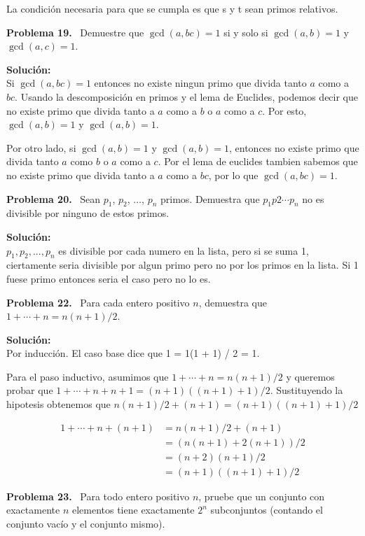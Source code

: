 \documentclass{article}
\newcounter{problem}
\newcounter{solution}
\newcommand\Problem[1]{%
  \stepcounter{problem}%
  \textbf{Problema #1.}~%
  \setcounter{solution}{0}%
}
\newcommand\TheSolution{%
  \textbf{Solución:}\\%
}
\begin{document}
La condición necesaria para que se cumpla es que s y t sean primos relativos.


\Problem{19} Demuestre que $\gcd(a, bc) = 1$ si y solo si $\gcd(a, b) = 1$ y
$\gcd(a, c) = 1$.

\TheSolution{}
Si $\gcd(a, bc) = 1$ entonces no existe ningun primo que divida tanto $a$ como
a $bc$. Usando la descomposición en primos y el lema de Euclides, podemos
decir que no existe primo que divida tanto a $a$ como a $b$ o $a$ como a $c$.
Por esto, $\gcd(a, b) = 1$ y $\gcd(a, b) = 1$.

Por otro lado, si $\gcd(a, b) = 1$ y $\gcd(a, b) = 1$, entonces no existe primo
que divida tanto $a$ como $b$ o $a$ como a $c$. Por el lema de euclides tambien
sabemos que no existe primo que divida tanto a $a$ como a $bc$, por lo que
$\gcd(a, bc) = 1$.

\Problem{20} Sean $p_1$, $p_2$, $\ldots$, $p_n$ primos. Demuestra que $p_1 p{2}
\cdots p_n$ no es divisible por ninguno de estos primos.

\TheSolution{}
$p_{1} , p_{2} , . . . , p_{n}$ es divisible por cada numero en la lista, pero
si se suma 1, ciertamente seria divisible por algun primo pero no por los
primos en la lista. Si 1 fuese primo entonces seria el caso pero no lo es.

\Problem{22} Para cada entero positivo $n$, demuestra que $1 + \cdots + n = n(n
+ 1) / 2$.

\TheSolution{}
Por inducción. El caso base dice que 1 = 1(1 + 1) / 2 = 1.

Para el paso inductivo, asumimos que $1 + \cdots + n = n(n
+ 1) / 2$ y queremos probar que $1 + \cdots + n + n + 1 = (n + 1)((n + 1) + 1)
/ 2$. Sustituyendo la hipotesis obtenemos que $n(n + 1) / 2 + (n + 1) = (n +
1)((n + 1) + 1) / 2$

\[
  \begin{split}
    1 + \cdots + n + (n + 1) &= n(n + 1) / 2 + (n + 1) \\
                             &= (n(n + 1) + 2(n + 1)) / 2 \\
                             &= (n + 2)(n + 1) / 2 \\
                             &= (n + 1)((n + 1) + 1) / 2
  \end{split}
\]

\Problem{23} Para todo entero positivo $n$, pruebe que un conjunto con
exactamente $n$ elementos tiene exactamente $2^{n}$ subconjuntos (contando el
conjunto vacío y el conjunto mismo).
\end{document}
